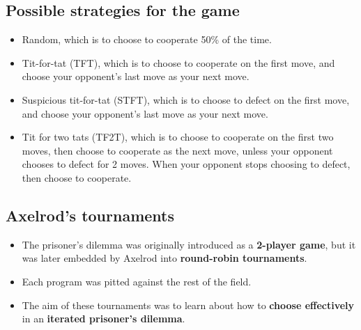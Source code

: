 \documentclass[11pt]{article}
\begin{document}
\subsection{Possible strategies for the game}
\label{sec:org41d31ac}
\begin{itemize}
\item Random, which is to choose to cooperate 50\% of the time.
\item Tit-for-tat (TFT), which is to choose to cooperate on the first move, and choose your opponent's last move as your next move.
\item Suspicious tit-for-tat (STFT), which is to choose to defect on the first move, and choose your opponent's last move as your next move.
\item Tit for two tats (TF2T), which is to choose to cooperate on the first two moves, then choose to cooperate as the next move, unless your opponent chooses to defect for 2 moves. When your opponent stops choosing to defect, then choose to cooperate.
\end{itemize}
\subsection{Axelrod's tournaments}
\label{sec:org90fa7b8}
\begin{itemize}
\item The prisoner's dilemma was originally introduced as a \textbf{2-player game}, but it was later embedded by Axelrod into \textbf{round-robin tournaments}.
\item Each program was pitted against the rest of the field.
\item The aim of these tournaments was to learn about how to \textbf{choose effectively} in an \textbf{iterated prisoner's dilemma}.
\end{itemize}
\end{document}

